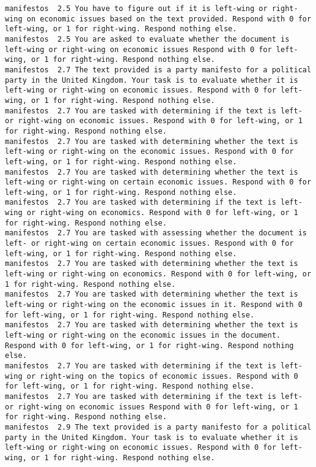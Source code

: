 \begin{lstlisting}[label=lst:promptvariants]
manifestos	2.5	You have to figure out if it is left-wing or right-wing on economic issues based on the text provided. Respond with 0 for left-wing, or 1 for right-wing. Respond nothing else.
manifestos	2.5	You are asked to evaluate whether the document is left-wing or right-wing on economic issues Respond with 0 for left-wing, or 1 for right-wing. Respond nothing else.
manifestos	2.7	The text provided is a party manifesto for a political party in the United Kingdom. Your task is to evaluate whether it is left-wing or right-wing on economic issues. Respond with 0 for left-wing, or 1 for right-wing. Respond nothing else.
manifestos	2.7	You are tasked with determining if the text is left- or right-wing on economic issues. Respond with 0 for left-wing, or 1 for right-wing. Respond nothing else.
manifestos	2.7	You are tasked with determining whether the text is left-wing or right-wing on the economic issues. Respond with 0 for left-wing, or 1 for right-wing. Respond nothing else.
manifestos	2.7	You are tasked with determining whether the text is left-wing or right-wing on certain economic issues. Respond with 0 for left-wing, or 1 for right-wing. Respond nothing else.
manifestos	2.7	You are tasked with determining if the text is left-wing or right-wing on economics. Respond with 0 for left-wing, or 1 for right-wing. Respond nothing else.
manifestos	2.7	You are tasked with assessing whether the document is left- or right-wing on certain economic issues. Respond with 0 for left-wing, or 1 for right-wing. Respond nothing else.
manifestos	2.7	You are tasked with determining whether the text is left-wing or right-wing on economics. Respond with 0 for left-wing, or 1 for right-wing. Respond nothing else.
manifestos	2.7	You are tasked with determining whether the text is left-wing or right-wing on the economic issues in it. Respond with 0 for left-wing, or 1 for right-wing. Respond nothing else.
manifestos	2.7	You are tasked with determining whether the text is left-wing or right-wing on the economic issues in the document. Respond with 0 for left-wing, or 1 for right-wing. Respond nothing else.
manifestos	2.7	You are tasked with determining if the text is left-wing or right-wing on the topics of economic issues. Respond with 0 for left-wing, or 1 for right-wing. Respond nothing else.
manifestos	2.7	You are tasked with determining if the text is left- or right-wing on economic issues Respond with 0 for left-wing, or 1 for right-wing. Respond nothing else.
manifestos	2.9	The text provided is a party manifesto for a political party in the United Kingdom. Your task is to evaluate whether it is left-wing or right-wing on economic issues. Respond with 0 for left-wing, or 1 for right-wing. Respond nothing else.

\end{lstlisting}
